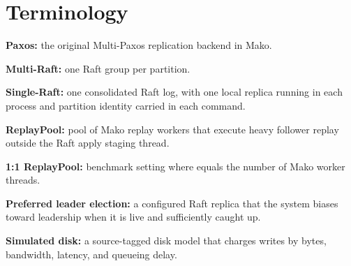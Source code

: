 \chapter{Terminology}

\textbf{Paxos:} the original Multi-Paxos replication backend in Mako.

\textbf{Multi-Raft:} one Raft group per partition.

\textbf{Single-Raft:} one consolidated Raft log, with one local replica running in
each process and partition identity carried in each command.

\textbf{ReplayPool:} pool of Mako replay workers that execute heavy follower replay
outside the Raft apply staging thread.

\textbf{1:1 ReplayPool:} benchmark setting where  equals the
number of Mako worker threads.

\textbf{Preferred leader election:} a configured Raft replica that the system biases toward
leadership when it is live and sufficiently caught up.

\textbf{Simulated disk:} a source-tagged disk model that charges writes by
bytes, bandwidth, latency, and queueing delay.
